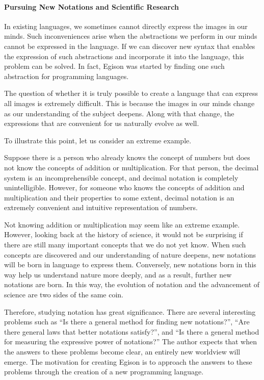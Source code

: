 \begin{framed}
  \paragraph{Pursuing New Notations and Scientific Research}
  In existing languages, we sometimes cannot directly express the images in our minds.
  Such inconveniences arise when the abstractions we perform in our minds cannot be expressed in the language.
  If we can discover new syntax that enables the expression of such abstractions and incorporate it into the language, this problem can be solved.
  In fact, Egison was started by finding one such abstraction for programming languages.

  The question of whether it is truly possible to create a language that can express all images is extremely difficult.
  This is because the images in our minds change as our understanding of the subject deepens.
  Along with that change, the expressions that are convenient for us naturally evolve as well.

  To illustrate this point, let us consider an extreme example.

  Suppose there is a person who already knows the concept of numbers but does not know the concepts of addition or multiplication.
  For that person, the decimal system is an incomprehensible concept, and decimal notation is completely unintelligible.
  However, for someone who knows the concepts of addition and multiplication and their properties to some extent, decimal notation is an extremely convenient and intuitive representation of numbers.

  Not knowing addition or multiplication may seem like an extreme example.
  However, looking back at the history of science, it would not be surprising if there are still many important concepts that we do not yet know.
  When such concepts are discovered and our understanding of nature deepens, new notations will be born in language to express them.
  Conversely, new notations born in this way help us understand nature more deeply, and as a result, further new notations are born.
  In this way, the evolution of notation and the advancement of science are two sides of the same coin.

  Therefore, studying notation has great significance.
  There are several interesting problems such as ``Is there a general method for finding new notations?'', ``Are there general laws that better notations satisfy?'', and ``Is there a general method for measuring the expressive power of notations?''
  The author expects that when the answers to these problems become clear, an entirely new worldview will emerge.
  The motivation for creating Egison is to approach the answers to these problems through the creation of a new programming language.
\end{framed}

